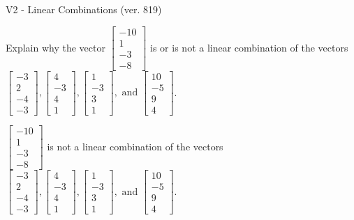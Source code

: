 \begin{exercise}
  \begin{exerciseTitle}V2 - Linear Combinations (ver. 819)\end{exerciseTitle}
  \begin{exerciseStatement}
    Explain why the vector \(\left[\begin{array}{c}
-10 \\
1 \\
-3 \\
-8
\end{array}\right]\)  is or is not a linear 
	combination of the vectors \(\left[\begin{array}{c}
-3 \\
2 \\
-4 \\
-3
\end{array}\right] , \left[\begin{array}{c}
4 \\
-3 \\
4 \\
1
\end{array}\right] , \left[\begin{array}{c}
1 \\
-3 \\
3 \\
1
\end{array}\right] , \text{ and } \left[\begin{array}{c}
10 \\
-5 \\
9 \\
4
\end{array}\right]\).
	


  \end{exerciseStatement}
  \begin{exerciseAnswer}
   \(\left[\begin{array}{c}
-10 \\
1 \\
-3 \\
-8
\end{array}\right]\) 
  	 is not  
	a linear combination of the vectors \(\left[\begin{array}{c}
-3 \\
2 \\
-4 \\
-3
\end{array}\right] , \left[\begin{array}{c}
4 \\
-3 \\
4 \\
1
\end{array}\right] , \left[\begin{array}{c}
1 \\
-3 \\
3 \\
1
\end{array}\right] , \text{ and } \left[\begin{array}{c}
10 \\
-5 \\
9 \\
4
\end{array}\right]\).


\end{exerciseAnswer}
\end{exercise}
